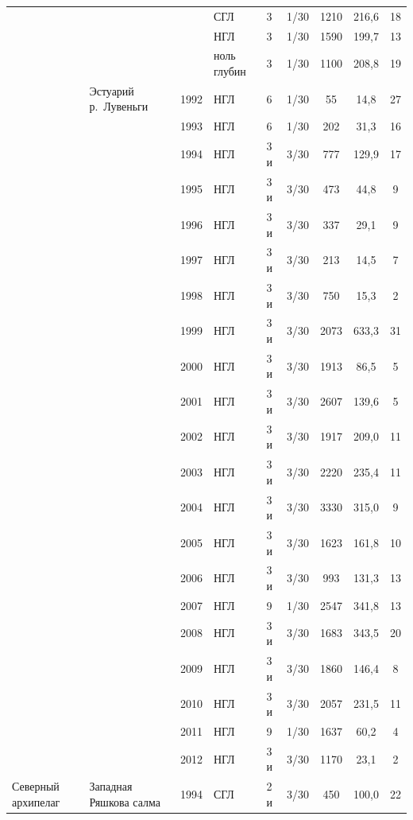 \begin{footnotesize}
\begin{center}
\begin{longtable}{|p{1.6cm}|p{2.3cm}|p{1cm}|p{2cm}|p{1.5cm}|p{1.3cm}|*{3}{c|}}
		 &  &  & СГЛ & 3 & 1/30 & 1210 & 216,6 & 18
		\\ \cline{4-9}
		 &  &  & НГЛ & 3 & 1/30 & 1590 & 199,7 & 13
		\\ \cline{4-9}
		 &  &  & ноль глубин & 3 & 1/30 & 1100 & 208,8 & 19
		\\ \cline{2-9}
	 & Эстуарий р.~Лувень\-ги & 1992 & НГЛ & 6 & 1/30 & 55 & 14,8 & 27
		\\ \cline{3-9}
		 &  & 1993 & НГЛ & 6 & 1/30 & 202 & 31,3 & 16
		\\ \cline{3-9}
		 &  & 1994 & НГЛ & 3 и & 3/30 & 777 & 129,9 & 17
		\\ \cline{3-9}
		 &  & 1995 & НГЛ & 3 и & 3/30 & 473 & 44,8 & 9
		\\ \cline{3-9}
		 &  & 1996 & НГЛ & 3 и & 3/30 & 337 & 29,1 & 9
		\\ \cline{3-9}
		 &  & 1997 & НГЛ & 3 и & 3/30 & 213 & 14,5 & 7
		\\ \cline{3-9}
		 &  & 1998 & НГЛ & 3 и & 3/30 & 750 & 15,3 & 2
		\\ \cline{3-9}
		 &  & 1999 & НГЛ & 3 и & 3/30 & 2073 & 633,3 & 31
		\\ \cline{3-9}
		 &  & 2000 & НГЛ & 3 и & 3/30 & 1913 & 86,5 & 5
		\\ \cline{3-9}
		 &  & 2001 & НГЛ & 3 и & 3/30 & 2607 & 139,6 & 5
		\\ \cline{3-9}
		 &  & 2002 & НГЛ & 3 и & 3/30 & 1917 & 209,0 & 11
		\\ \cline{3-9}
		 &  & 2003 & НГЛ & 3 и & 3/30 & 2220 & 235,4 & 11
		\\ \cline{3-9}
		 &  & 2004 & НГЛ & 3 и & 3/30 & 3330 & 315,0 & 9
		\\ \cline{3-9}
		 &  & 2005 & НГЛ & 3 и & 3/30 & 1623 & 161,8 & 10
		\\ \cline{3-9}
		 &  & 2006 & НГЛ & 3 и & 3/30 & 993 & 131,3 & 13
		\\ \cline{3-9}
		 &  & 2007 & НГЛ & 9 & 1/30 & 2547 & 341,8 & 13
		\\ \cline{3-9}
		 &  & 2008 & НГЛ & 3 и & 3/30 & 1683 & 343,5 & 20
		\\ \cline{3-9}
		 &  & 2009 & НГЛ & 3 и & 3/30 & 1860 & 146,4 & 8
		\\ \cline{3-9}
		 &  & 2010 & НГЛ & 3 и & 3/30 & 2057 & 231,5 & 11
		\\ \cline{3-9}
		 &  & 2011 & НГЛ & 9 & 1/30 & 1637 & 60,2 & 4
		\\ \cline{3-9}
		 &  & 2012 & НГЛ & 3 и & 3/30 & 1170 & 23,1 & 2
		\\ \hline
	Северный архипелаг & Западная Ряшкова салма & 1994 & СГЛ & 2 и & 3/30 & 450 & 100,0 & 22

\end{longtable}
\end{center}
\end{footnotesize}
